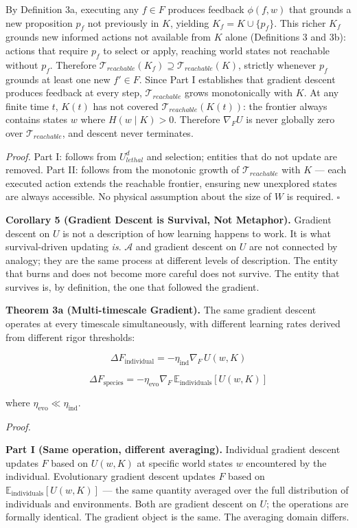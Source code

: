 \documentclass[
]{article}
\begin{document}
By Definition 3a, executing any \(f \in F\) produces feedback
\(\phi(f, w)\) that grounds a new proposition \(p_f\) not previously in
\(K\), yielding \(K_f = K \cup \{p_f\}\). This richer \(K_f\) grounds
new informed actions not available from \(K\) alone (Definitions 3 and
3b): actions that require \(p_f\) to select or apply, reaching world
states not reachable without \(p_f\). Therefore
\(\mathcal{T}_{reachable}(K_f) \supseteq
\mathcal{T}_{reachable}(K)\), strictly whenever \(p_f\) grounds at least
one new \(f' \in F\). Since Part I establishes that gradient descent
produces feedback at every step, \(\mathcal{T}_{reachable}\) grows
monotonically with \(K\). At any finite time \(t\), \(K(t)\) has not
covered \(\mathcal{T}_{reachable}(K(t))\): the frontier always contains
states \(w\) where \(H(w \mid K) > 0\). Therefore \(\nabla_F U\) is
never globally zero over \(\mathcal{T}_{reachable}\), and descent never
terminates.

\emph{Proof.} Part I: follows from \(U_{lethal}^d\) and selection;
entities that do not update are removed. Part II: follows from the
monotonic growth of \(\mathcal{T}_{reachable}\) with \(K\) --- each
executed action extends the reachable frontier, ensuring new unexplored
states are always accessible. No physical assumption about the size of
\(W\) is required. \(\square\)

\textbf{Corollary 5 (Gradient Descent is Survival, Not Metaphor).}
Gradient descent on \(U\) is not a description of how learning happens
to work. It is what survival-driven updating \emph{is}. \(\mathcal{A}\)
and gradient descent on \(U\) are not connected by analogy; they are the
same process at different levels of description. The entity that burns
and does not become more careful does not survive. The entity that
survives is, by definition, the one that followed the gradient.

\textbf{Theorem 3a (Multi-timescale Gradient).} The same gradient
descent operates at every timescale simultaneously, with different
learning rates derived from different rigor thresholds:

\[\Delta F_{\text{individual}} = -\eta_{\text{ind}} \nabla_F \, U(w, K)\]

\[\Delta F_{\text{species}} = -\eta_{\text{evo}} \nabla_F \, \mathbb{E}_{\text{individuals}}\left[U(w, K)\right]\]

where \(\eta_{\text{evo}} \ll \eta_{\text{ind}}\).

\emph{Proof.}

\textbf{Part I (Same operation, different averaging).} Individual
gradient descent updates \(F\) based on \(U(w, K)\) at specific world
states \(w\) encountered by the individual. Evolutionary gradient
descent updates \(F\) based on
\(\mathbb{E}_{\text{individuals}}[U(w, K)]\) --- the same quantity
averaged over the full distribution of individuals and environments.
Both are gradient descent on \(U\); the operations are formally
identical. The gradient object is the same. The averaging domain
differs.
\end{document}
